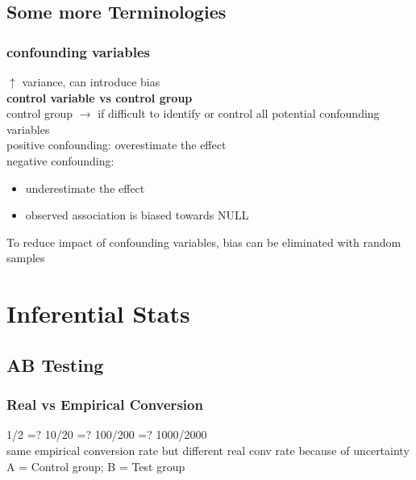 \documentclass{beamer}
\begin{document}
\subsection{Some more Terminologies}

\begin{frame}\frametitle{confounding variables}
	$\uparrow$ variance, can introduce bias\\
	\textbf{control variable vs control group}\\
	control group $\rightarrow$ if difficult to identify or control all potential confounding variables\\
	positive confounding: overestimate the effect\\
	negative confounding: 
	\begin{itemize}
		\item underestimate the effect
		\item observed association is biased towards NULL
	\end{itemize}
	To reduce impact of confounding variables, bias can be eliminated with random samples
\end{frame}










\section{Inferential Stats}




\subsection{AB Testing}

\begin{frame}\frametitle{Real vs Empirical Conversion}
	1/2 =? 10/20 =? 100/200 =? 1000/2000\\
	same empirical conversion rate but different real conv rate because of uncertainty\\
	A = Control group; B = Test group\\
\end{frame}
\end{document}
